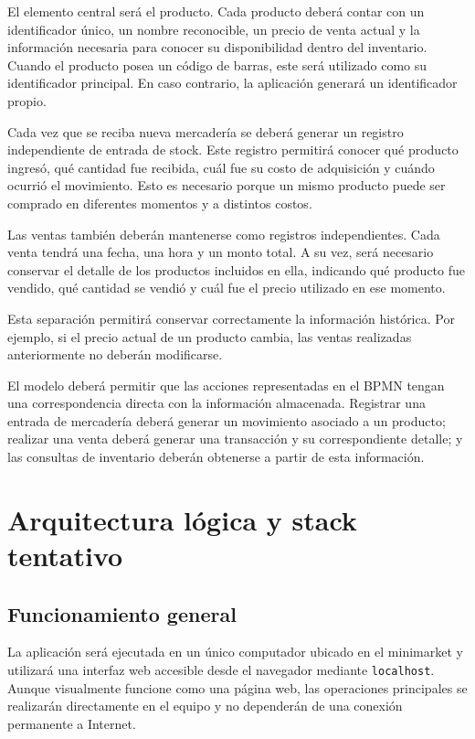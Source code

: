 \documentclass[10pt,a4paper]{article}
\begin{document}
El elemento central será el producto. Cada producto deberá contar con un identificador único, un nombre reconocible, un precio de venta actual y la información necesaria para conocer su disponibilidad dentro del inventario. Cuando el producto posea un código de barras, este será utilizado como su identificador principal. En caso contrario, la aplicación generará un identificador propio.

Cada vez que se reciba nueva mercadería se deberá generar un registro independiente de entrada de stock. Este registro permitirá conocer qué producto ingresó, qué cantidad fue recibida, cuál fue su costo de adquisición y cuándo ocurrió el movimiento. Esto es necesario porque un mismo producto puede ser comprado en diferentes momentos y a distintos costos.

Las ventas también deberán mantenerse como registros independientes. Cada venta tendrá una fecha, una hora y un monto total. A su vez, será necesario conservar el detalle de los productos incluidos en ella, indicando qué producto fue vendido, qué cantidad se vendió y cuál fue el precio utilizado en ese momento.

Esta separación permitirá conservar correctamente la información histórica. Por ejemplo, si el precio actual de un producto cambia, las ventas realizadas anteriormente no deberán modificarse.

El modelo deberá permitir que las acciones representadas en el BPMN tengan una correspondencia directa con la información almacenada. Registrar una entrada de mercadería deberá generar un movimiento asociado a un producto; realizar una venta deberá generar una transacción y su correspondiente detalle; y las consultas de inventario deberán obtenerse a partir de esta información.



\section{Arquitectura lógica y stack tentativo}

\subsection{Funcionamiento general}

La aplicación será ejecutada en un único computador ubicado en el minimarket y utilizará una interfaz web accesible desde el navegador mediante \texttt{localhost}. Aunque visualmente funcione como una página web, las operaciones principales se realizarán directamente en el equipo y no dependerán de una conexión permanente a Internet.
\end{document}
